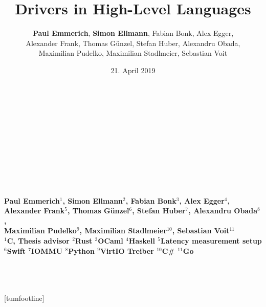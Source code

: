 \documentclass[NET,english,aspectratio=169,notitleframe]{tumbeamer}
\author[Paul Emmerich, Simon Ellmann]{\textbf{Paul Emmerich}, \textbf{Simon Ellmann}, Fabian Bonk, Alex Egger,\\ Alexander Frank, Thomas Günzel, Stefan Huber, Alexandru Obada,\\ Maximilian Pudelko, Maximilian Stadlmeier, Sebastian Voit}
\title{Drivers in High-Level Languages}
\date{21. April 2019}
\begin{document}
  \begin{frame}[c,noframenumbering]
  \centering%
  \Large%
  \strut\textcolor{TUMBlue}{\inserttitle}%
  \\[4ex]%
  \normalsize%
\footnotesize  \strut\insertauthor%
  \\[2ex]%
  \footnotesize%
  \insertdate%
  \\[4ex]%
  \ifdefined\departmentname%
    \ifdefined\chairname%
      \chairname\\%
    \fi%
    \departmentname\\%
  \fi%
  \TUMname\\%
\end{frame}

  \begin{frame}[c,noframenumbering]
  \centering%
  \Large%
  \strut\textcolor{TUMBlue}{\inserttitle}%
  \\[4ex]%
  \footnotesize%
  \strut{} \bfseries Paul Emmerich$^1$, Simon Ellmann$^2$, Fabian Bonk$^3$, Alex Egger$^4$,\\ Alexander Frank$^5$, Thomas Günzel$^6$, Stefan Huber$^7$, Alexandru Obada$^8$,\\ Maximilian Pudelko$^9$, Maximilian Stadlmeier$^{10}$, Sebastian Voit$^{11}$ \normalfont %
  \\[2ex]%
  \scriptsize%
  $^1$C, Thesis advisor\hspace{1em}
  $^2$Rust\hspace{1em}
  $^3$OCaml\hspace{1em}
  $^4$Haskell\hspace{1em}
  $^5$Latency measurement setup\hspace{1em}\\
  $^6$Swift\hspace{1em}
  $^7$IOMMU\hspace{1em}
  $^8$Python\hspace{1em}
  $^9$VirtIO Treiber\hspace{1em}
  $^{10}$C\#\hspace{1em}
  $^{11}$Go\hspace{1em}
  \\[4ex]%
  \footnotesize
    \ifdefined\departmentname%
    \ifdefined\chairname%
      \chairname\\%
    \fi%
    \departmentname\\%
  \fi%
  \TUMname\\%
\end{frame}[tumfootline]
\end{document}
